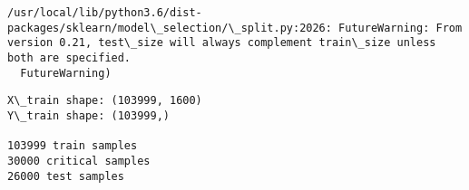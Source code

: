 \documentclass[11pt]{article}
\begin{document}
    \begin{Verbatim}[commandchars=\\\{\}]
/usr/local/lib/python3.6/dist-packages/sklearn/model\_selection/\_split.py:2026: FutureWarning: From version 0.21, test\_size will always complement train\_size unless both are specified.
  FutureWarning)

    \end{Verbatim}

    \begin{Verbatim}[commandchars=\\\{\}]
X\_train shape: (103999, 1600)
Y\_train shape: (103999,)

103999 train samples
30000 critical samples
26000 test samples

    \end{Verbatim}
\end{document}
